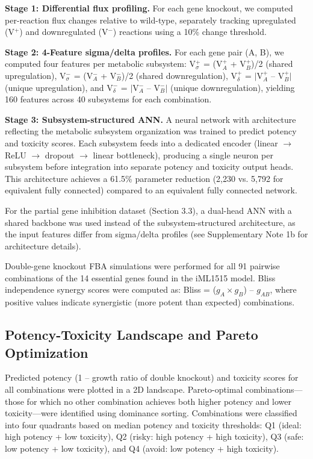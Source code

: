 \documentclass[12pt,a4paper]{article}
\begin{document}
\textbf{Stage 1: Differential flux profiling.} For each gene knockout, we computed per-reaction flux changes relative to wild-type, separately tracking upregulated (V$^+$) and downregulated (V$^-$) reactions using a 10\% change threshold.

\textbf{Stage 2: 4-Feature sigma/delta profiles.} For each gene pair (A, B), we computed four features per metabolic subsystem: V$^+_\sigma$ = (V$^+_A$ + V$^+_B$)/2 (shared upregulation), V$^-_\sigma$ = (V$^-_A$ + V$^-_B$)/2 (shared downregulation), V$^+_\delta$ = $|$V$^+_A$ -- V$^+_B$$|$ (unique upregulation), and V$^-_\delta$ = $|$V$^-_A$ -- V$^-_B$$|$ (unique downregulation), yielding 160 features across 40 subsystems for each combination.

\textbf{Stage 3: Subsystem-structured ANN.} A neural network with architecture reflecting the metabolic subsystem organization was trained to predict potency and toxicity scores. Each subsystem feeds into a dedicated encoder (linear $\rightarrow$ ReLU $\rightarrow$ dropout $\rightarrow$ linear bottleneck), producing a single neuron per subsystem before integration into separate potency and toxicity output heads. This architecture achieves a 61.5\% parameter reduction (2,230 vs. 5,792 for equivalent fully connected) compared to an equivalent fully connected network.

For the partial gene inhibition dataset (Section 3.3), a dual-head ANN with a shared backbone was used instead of the subsystem-structured architecture, as the input features differ from sigma/delta profiles (see Supplementary Note 1b for architecture details).

Double-gene knockout FBA simulations were performed for all 91 pairwise combinations of the 14 essential genes found in the iML1515 model. Bliss independence synergy scores \citep{bliss1939} were computed as: Bliss = ($g_A \times g_B$) -- $g_{AB}$, where positive values indicate synergistic (more potent than expected) combinations.

\subsection{Potency-Toxicity Landscape and Pareto Optimization}
Predicted potency (1 -- growth ratio of double knockout) and toxicity scores for all combinations were plotted in a 2D landscape. Pareto-optimal combinations---those for which no other combination achieves both higher potency and lower toxicity---were identified using dominance sorting. Combinations were classified into four quadrants based on median potency and toxicity thresholds: Q1 (ideal: high potency + low toxicity), Q2 (risky: high potency + high toxicity), Q3 (safe: low potency + low toxicity), and Q4 (avoid: low potency + high toxicity).
\end{document}
